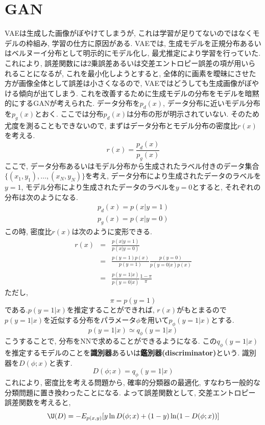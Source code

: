 \documentclass[twocolumn]{jarticle}
\begin{document}
\section{GAN}
VAEは生成した画像がぼやけてしまうが, これは学習が足りてないのではなくモデルの枠組み, 学習の仕方に原因がある. VAEでは, 生成モデルを正規分布あるいはベルヌーイ分布として明示的にモデル化し, 最尤推定により学習を行っていた. これにより, 誤差関数には2乗誤差あるいは交差エントロピー誤差の項が用いられることになるが, これを最小化しようとすると, 全体的に画素を曖昧にさせた方が画像全体として誤差は小さくなるので, VAEではどうしても生成画像がぼやける傾向が出てしまう. これを改善するために生成モデルの分布をモデルを暗黙的にするGANが考えられた.
データ分布を${p_d(x)}$, データ分布に近いモデル分布を${p_g(x)}$とおく. ここでは分布${p_d(x)}$は分布の形が明示されていない. そのため尤度を測ることもできないので, まずはデータ分布とモデル分布の密度比${r(x)}$を考える.
\begin{equation}
  r(x) = \frac{p_d(x)}{p_g(x)}
\end{equation}
ここで, データ分布あるいはモデル分布から生成されたラベル付きのデータ集合${\{(x_1, y_1), \ldots, (x_N, y_N)\}}$を考え, データ分布により生成されたデータのラベルを${y=1}$, モデル分布により生成されたデータのラベルを${y=0}$とすると, それぞれの分布は次のようになる.
\begin{eqnarray}
  p_d(x) = p(x|y=1) \\
  p_g(x) = p(x|y=0)
\end{eqnarray}
この時, 密度比${r(x)}$は次のように変形できる.
\begin{eqnarray}
  r(x) &=& \frac{p(x|y=1)}{p(x|y=0)} \nonumber \\
  &=& \frac{p(y=1)p(x)}{p(y=1)} \frac{p(y=0)}{p(y=0|x)p(x)} \nonumber \\
  &=& \frac{p(y=1|x)}{p(y=0|x)} \frac{1-\pi}{\pi}
\end{eqnarray}
ただし,
\begin{equation}
  \pi = p(y=1)
\end{equation}
である.${p(y=1|x)}$を推定することができれば, ${r(x)}$がもとまるので ${p(y=1|x)}$を近似する分布をパラメータ${\phi}$を用いて${p_\phi(y=1|x)}$とする.
\begin{equation}
  p(y=1|x) \simeq q_\phi(y=1|x)
\end{equation}
こうすることで, 分布をNNで求めることができるようになる. この${q_\phi(y=1|x)}$を推定するモデルのことを{\bf 識別器}あるいは{\bf 鑑別器(discriminator)}という. 識別器を${D(\phi;x)}$と表す.
\begin{equation}
  D(\phi;x) = q_\phi(y=1|x)
\end{equation}
これにより, 密度比を考える問題から, 確率的分類器の最適化, すなわち一般的な分類問題に置き換わったことになる. よって誤差関数として, 交差エントロピー誤差関数を考えると,
\begin{equation}
  \U(D) = -E_{p(x, y)} [y\ln D(\phi; x) + (1 - y)\ln(1 - D(\phi; x))]
\end{equation}
\end{document}
